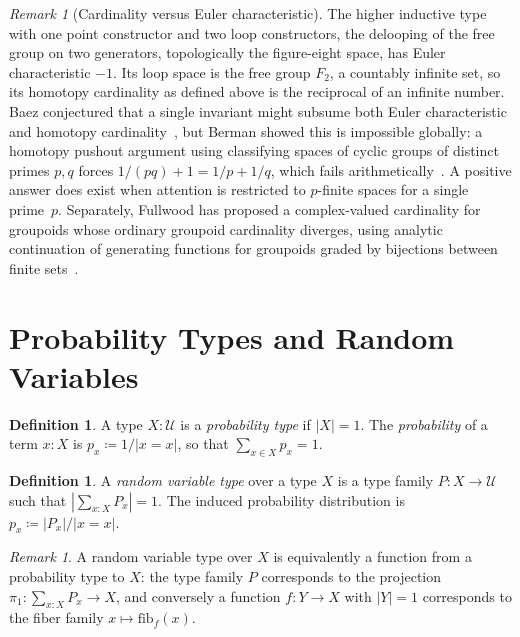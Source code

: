 \documentclass[12pt]{amsart}
\newcommand{\U}{\mathcal{U}}
\newcommand{\fib}{\mathrm{fib}}
\theoremstyle{plain}
\theoremstyle{definition}
\newtheorem{definition}[theorem]{Definition}
\theoremstyle{remark}
\newtheorem{remark}[theorem]{Remark}
\begin{document}
\begin{remark}[Cardinality versus Euler characteristic]\label{rem:negative}
The higher inductive type with one point constructor and two loop constructors, the delooping of the free group on two generators, topologically the figure-eight space, has Euler characteristic $-1$. Its loop space is the free group $F_2$, a countably infinite set, so its homotopy cardinality as defined above is the reciprocal of an infinite number. Baez conjectured that a single invariant might subsume both Euler characteristic and homotopy cardinality~\cite{baez_counting}, but Berman showed this is impossible globally: a homotopy pushout argument using classifying spaces of cyclic groups of distinct primes $p,q$ forces $1/(pq)+1 = 1/p+1/q$, which fails arithmetically~\cite{berman2018euler}. A positive answer does exist when attention is restricted to $p$-finite spaces for a single prime~$p$. Separately, Fullwood has proposed a complex-valued cardinality for groupoids whose ordinary groupoid cardinality diverges, using analytic continuation of generating functions for groupoids graded by bijections between finite sets~\cite{fullwood2021analytic}.
\end{remark}

\section{Probability Types and Random Variables}\label{sec:probability}

\begin{definition}\label{def:prob-type}
A type $X:\U$ is a \emph{probability type} if $|X|=1$. The \emph{probability} of a term $x:X$ is $p_x \coloneqq 1/|x=x|$, so that $\sum_{x\in X}p_x = 1$.
\end{definition}

\begin{definition}\label{def:rv-type}
A \emph{random variable type} over a type $X$ is a type family $P:X\to\U$ such that $|\sum_{x:X}P_x|=1$. The induced probability distribution is $p_x \coloneqq |P_x|/|x=x|$.
\end{definition}

\begin{remark}\label{rem:rv-equiv}
A random variable type over $X$ is equivalently a function from a probability type to $X$: the type family $P$ corresponds to the projection $\pi_1:\sum_{x:X}P_x\to X$, and conversely a function $f:Y\to X$ with $|Y|=1$ corresponds to the fiber family $x\mapsto\fib_f(x)$.
\end{remark}
\end{document}
